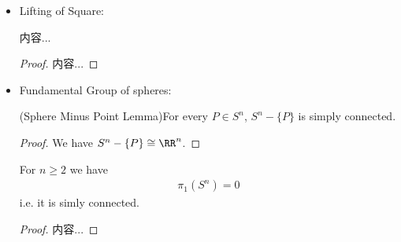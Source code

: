 \documentclass[Total.tex]{subfiles}
\begin{document}
\begin{itemize}
\begin{proof}
			Thus, the definition of $\tilde{f}$ can be extended to $A\cup B$. 
		\end{proof}
		
		\begin{lemma}
			(Lift from $S^1$ to $\RR$) Given any continuous map 
			\begin{gather*}
				f:[0,1]\rightarrow S^1
			\end{gather*}
			and any $\tilde{y}_0\in \RR$ with
			\begin{gather*}
				f(0)=exp(i\cdot \tilde{y}_0)=\Xi(\tilde{y}_0)
			\end{gather*}
			There exists a \textbf{unique lift} $\tilde{f}:[0,1]\rightarrow \RR$ of $f$ with
			\begin{gather*}
				\tilde{f}(0)=\tilde{y}_0
			\end{gather*} 
		\end{lemma}
		\begin{proof}
			\begin{itemize}
				\item Uniqueness: By Lift Uniqueness lemma.
				\item Existence: Apply Lift-Extension lemma. Decompose the interval $[0,1]$ into smaller intervals, such that: on each subinterval, the image of $f$misses at least one point in $S^1$.
			\end{itemize}
		\end{proof}
		\begin{theorem}
			The map
			\begin{gather*}
				\Psi:\ZZ\rightarrow \pi_1(S^1,1)\qquad \\
				\Theta:\pi_1(S^1,z_0)\rightarrow \ZZ\qquad 
			\end{gather*}
			are well defined, and are isomorphisms of group.
		\end{theorem}
		\begin{proof}
			
		\end{proof}
		\item Lifting of Square:
		\begin{lemma}
			内容...
		\end{lemma}
		\begin{proof}
			内容...
		\end{proof}
		\item Fundamental Group of spheres:
		\begin{lemma}
			(Sphere Minus Point Lemma)For every $P\in S^n$, $S^n-\{P\}$ is simply connected.
		\end{lemma}
		\begin{proof}
			We have $S^n-\{P\}\cong \RR^n$. 
		\end{proof}
		\begin{proposition}
			For $n\geq 2$ we have
			\begin{gather*}
				\pi_1(S^n)=0
			\end{gather*}
			i.e. it is simly connected.
		\end{proposition}
		\begin{proof}
			内容...
		\end{proof}
		
	\end{itemize}
	
\end{document}
